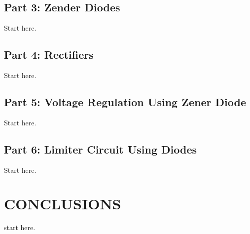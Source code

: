 \documentclass[letterpaper, 10 pt, conference]{ieeeconf}  %
\begin{document}
    \subsection{Part 3: Zender Diodes}
    Start here.
    \subsection{Part 4: Rectifiers}
    Start here.
    \subsection{Part 5: Voltage Regulation Using Zener Diode}
    Start here.
    \subsection{Part 6: Limiter Circuit Using Diodes}
    Start here.

    \section{CONCLUSIONS}
    start here.









%
%
%
%
%
%
%
\end{document}
